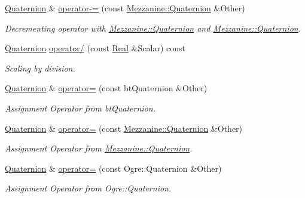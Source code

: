 \begin{DoxyCompactItemize}
\hyperlink{classMezzanine_1_1Quaternion}{Quaternion} \& \hyperlink{classMezzanine_1_1Quaternion_a549fb71ffdaacb0ced2828dabfc7f444}{operator-\/=} (const \hyperlink{classMezzanine_1_1Quaternion}{Mezzanine::Quaternion} \&Other)
\begin{DoxyCompactList}\small\item\em Decrementing operator with \hyperlink{classMezzanine_1_1Quaternion}{Mezzanine::Quaternion} and \hyperlink{classMezzanine_1_1Quaternion}{Mezzanine::Quaternion}. \item\end{DoxyCompactList}\item 
\hyperlink{classMezzanine_1_1Quaternion}{Quaternion} \hyperlink{classMezzanine_1_1Quaternion_a9616681bba1d8636f369d02afd221267}{operator/} (const \hyperlink{namespaceMezzanine_a726731b1a7df72bf3583e4a97282c6f6}{Real} \&Scalar) const 
\begin{DoxyCompactList}\small\item\em Scaling by division. \item\end{DoxyCompactList}\item 
\hyperlink{classMezzanine_1_1Quaternion}{Quaternion} \& \hyperlink{classMezzanine_1_1Quaternion_a9161be1bd30cc8ed85abd51ab25df13b}{operator=} (const btQuaternion \&Other)
\begin{DoxyCompactList}\small\item\em Assignment Operator from btQuaternion. \item\end{DoxyCompactList}\item 
\hyperlink{classMezzanine_1_1Quaternion}{Quaternion} \& \hyperlink{classMezzanine_1_1Quaternion_a33dc0fcfb1fc97e0c0db42e1f9279783}{operator=} (const \hyperlink{classMezzanine_1_1Quaternion}{Mezzanine::Quaternion} \&Other)
\begin{DoxyCompactList}\small\item\em Assignment Operator from \hyperlink{classMezzanine_1_1Quaternion}{Mezzanine::Quaternion}. \item\end{DoxyCompactList}\item 
\hyperlink{classMezzanine_1_1Quaternion}{Quaternion} \& \hyperlink{classMezzanine_1_1Quaternion_ac3fb6756c37ff9ba6fe33d63edc6c74f}{operator=} (const Ogre::Quaternion \&Other)
\begin{DoxyCompactList}\small\item\em Assignment Operator from Ogre::Quaternion. \item\end{DoxyCompactList}\item 

\end{DoxyCompactItemize}
